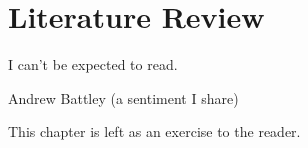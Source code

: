 \chapter{Literature Review}

\epigraph{I can't be expected to read.}{Andrew Battley (a sentiment I share)}

This chapter is left as an exercise to the reader.
